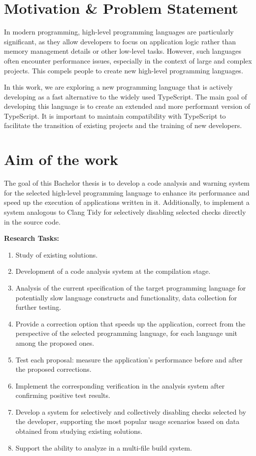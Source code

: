 \section{Motivation & Problem Statement}

In modern programming, high-level programming languages are particularly
significant, as they allow developers to focus on application
logic rather than memory management details or other low-level
tasks. However, such languages often encounter performance issues,
especially in the context of large and complex projects. This compels
people to create new high-level programming languages.

In this work, we are exploring a new programming language that is actively
developing as a fast alternative to the widely used TypeScript.
The main goal of developing this language is to create an extended
and more performant version of TypeScript. It is important to maintain
compatibility with TypeScript to facilitate the transition of existing
projects and the training of new developers.

\textbf{ }
\section{Aim of the work}
The goal of this Bachelor thesis is to develop a code analysis and warning system for the
selected high-level programming language to enhance its performance and speed
up the execution of applications written in it. Additionally, to
implement a system analogous to Clang Tidy for selectively disabling
selected checks directly in the source code.


\textbf{ }
\textbf{Research Tasks:}

\begin{enumerate}
    \item Study of existing solutions.
    \item Development of a code analysis system at the compilation stage.
    \item Analysis of the current specification of the target programming language for potentially slow language constructs and functionality, data collection for further testing.
    \item Provide a correction option that speeds up the application, correct from the perspective of the selected programming language, for each language unit among the proposed ones.
    \item Test each proposal: measure the application's performance before and after the proposed corrections.
    \item Implement the corresponding verification in the analysis system after confirming positive test results.
    \item Develop a system for selectively and collectively disabling checks selected by the developer, supporting the most popular usage scenarios based on data obtained from studying existing solutions.
    \item Support the ability to analyze in a multi-file build system.
\end{enumerate}


